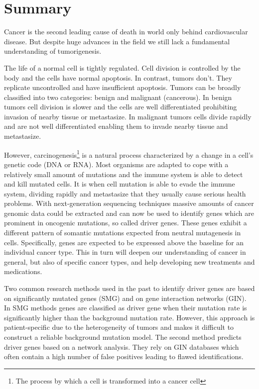 \documentclass{article}
\begin{document}
\vspace*{-8mm}
\section*{Summary}
Cancer is the second leading cause of death in world only behind cardiovascular disease\cite{bray2018globalCancerStats}. But despite huge advances in the field we still lack a fundamental understanding of tumorigenesis\cite{compendiumDriverGenes}.


The life of a normal cell is tightly regulated. Cell division is controlled by the body and the cells have normal apoptosis. In contrast, tumors don't. They replicate uncontrolled and have insufficient apoptosis\cite{essentialsOfCellLive}. Tumors can be broadly classified into two categories: benign and malignant (cancerous). 
In benign tumors cell division is slower and the cells are well differentiated prohibiting invasion of nearby tissue or metastasize. 
In malignant tumors cells divide rapidly and are not well differentiated enabling them to invade nearby tissue and metastasize\cite{pathologyBook}.

However, carcinogenesis\footnote{The process by which a cell is transformed into a cancer cell} is a natural process characterized by a change in a cell's genetic code (DNA or RNA)\cite{cancerGenome}.
Most organisms are adapted to cope with a relatively small amount of mutations and the immune system is able to detect and kill mutated cells. 
It is when cell mutation is able to evade the immune system, dividing rapidly and metastasize that they usually cause serious health problems.
With next-generation sequencing techniques massive amounts of cancer genomic data could be extracted and can now be used to identify genes which are prominent in oncogenic mutations, so called driver genes\cite{compendiumDriverGenes}. 
These genes exhibit a different pattern of somantic mutations expected from neutral mutagenesis in cells. Specifically, genes are expected to be expressed above the baseline for an individual cancer type.
This in turn will deepen our understanding of cancer in general, but also of specific cancer types, and help developing new treatments and medications.

Two common research methods used in the past to identify driver genes are based on significantly mutated genes (SMG) and on gene interaction networks (GIN).
In SMG methods genes are classified as driver gene when their mutation rate is significantly higher than the background mutation rate. However, this approach is patient-specific due to the heterogeneity of tumors and makes it difficult to construct a reliable background mutation model. The second method predicts driver genes based on a network analysis. They rely on GIN databases which often contain a high number of false positives leading to flawed identifications\cite{deepdriver}.
\end{document}
